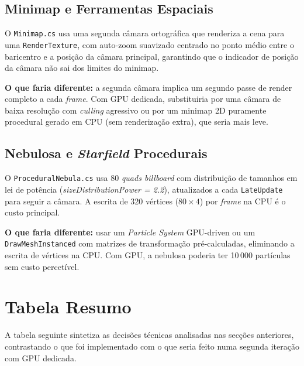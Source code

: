 \documentclass[12pt,a4paper]{article}
\begin{document}
\subsection{Minimap e Ferramentas Espaciais}

O \texttt{Minimap.cs} usa uma segunda c\^{a}mara ortogr\'{a}fica que renderiza a cena para uma \texttt{RenderTexture}, com auto-zoom suavizado centrado no ponto m\'{e}dio entre o baricentro e a posi\c{c}\~{a}o da c\^{a}mara principal, garantindo que o indicador de posi\c{c}\~{a}o da c\^{a}mara n\~{a}o sai dos limites do minimap.

\textbf{O que faria diferente:} a segunda c\^{a}mara implica um segundo passe de render completo a cada \textit{frame}. Com GPU dedicada, substituiria por uma c\^{a}mara de baixa resolu\c{c}\~{a}o com \textit{culling} agressivo ou por um minimap 2D puramente procedural gerado em CPU (sem renderiza\c{c}\~{a}o extra), que seria mais leve.

\subsection{Nebulosa e \textit{Starfield} Procedurais}

O \texttt{ProceduralNebula.cs} usa 80 \textit{quads billboard} com distribui\c{c}\~{a}o de tamanhos em lei de pot\^{e}ncia (\textit{sizeDistributionPower = 2.2}), atualizados a cada \texttt{LateUpdate} para seguir a c\^{a}mara. A escrita de 320 v\'{e}rtices ($80 \times 4$) por \textit{frame} na CPU \'{e} o custo principal.

\textbf{O que faria diferente:} usar um \textit{Particle System} GPU-driven ou um \texttt{DrawMeshInstanced} com matrizes de transforma\c{c}\~{a}o pr\'{e}-calculadas, eliminando a escrita de v\'{e}rtices na CPU. Com GPU, a nebulosa poderia ter 10\,000 part\'{i}culas sem custo percet\'{i}vel.

\section{Tabela Resumo}

A tabela seguinte sintetiza as decis\~{o}es t\'{e}cnicas analisadas nas sec\c{c}\~{o}es anteriores, contrastando o que foi implementado com o que seria feito numa segunda itera\c{c}\~{a}o com GPU dedicada.
\end{document}

